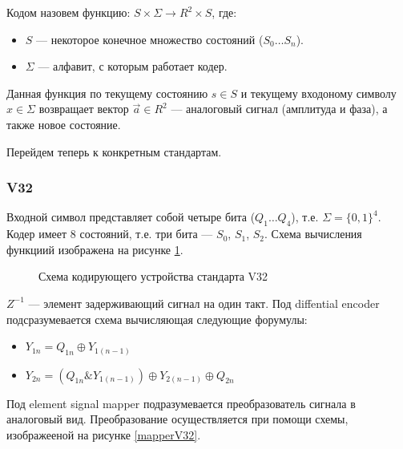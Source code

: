 \documentclass[a4paper,12pt]{article}
\begin{document}
Кодом назовем функцию: $S \times \Sigma \rightarrow R^2 \times S$, где:
\begin{itemize}
	\item $S$ --- некоторое конечное множество состояний ($S_0 \ldots S_n$).
	\item $\Sigma$ --- алфавит, с которым работает кодер.
\end{itemize}
Данная функция по текущему состоянию $s \in S$ и текущему входоному символу $x \in \Sigma$ возвращает вектор
$\vec{a} \in R^2$ --- аналоговый сигнал (амплитуда и фаза), а также новое состояние.

Перейдем теперь к конкретным стандартам.

\subsubsection{V32}
Входной символ представляет собой четыре бита ($Q_1 \ldots Q_4$), т.е. $\Sigma = \{0, 1\}^4$. Кодер имеет $8$
состояний, т.е. три бита --- $S_0$, $S_1$, $S_2$. Схема вычисления функциий изображена на рисунке \ref{schemeV32}.

\begin{figure}
	\caption{Схема кодирующего устройства стандарта V32}
	\label{schemeV32}
\end{figure}

$Z^{-1}$ --- элемент задерживающий сигнал на один такт.
Под diffential encoder подсразумевается схема вычисляющая следующие форумулы:
\begin{itemize}
	\item $Y_{1n} = Q_{1n} \oplus Y_{1(n - 1)}$
	\item $Y_{2n} = (Q_{1n} \& Y_{1(n - 1)}) \oplus Y_{2(n - 1)} \oplus Q_{2n}$
\end{itemize}

Под element signal mapper подразумевается преобразователь сигнала в аналоговый вид. Преобразование осуществляется
при помощи схемы, изображееной на рисунке \ref{mapperV32}.
\end{document}
